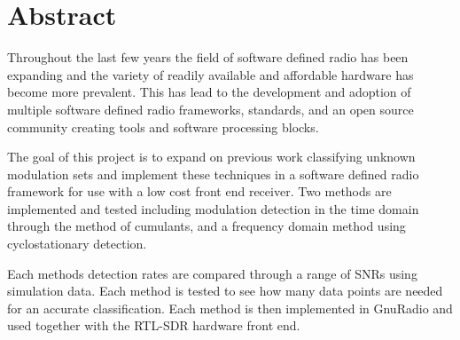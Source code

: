 \section*{Abstract}

Throughout the last few years the field of software defined radio has been
expanding and the variety of readily available and affordable hardware has
become more prevalent.  This has lead to the development and adoption of
multiple software defined radio frameworks, standards, and an open source
community creating tools and software processing blocks.  

The goal of this project is to expand on previous work classifying unknown
modulation sets and implement these techniques in a software defined radio
framework for use with a low cost front end receiver.  Two methods are
implemented and tested including modulation detection in the time domain through
the method of cumulants, and a frequency domain method using
cyclostationary detection.

Each methods detection rates are compared through a range of SNRs using
simulation data.  Each method is tested to see how many data points are needed
for an accurate classification. Each method is then implemented in GnuRadio
and used together with the RTL-SDR hardware front end. 
